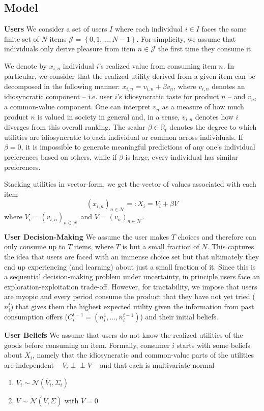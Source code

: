 \documentclass[sigconf]{acmart}
\begin{document}
\subsection{Model}
\par
\noindent \textbf{Users} We consider a set of users $I$ where each individual $i \in I$ faces the same finite set of $N$ items $\mathcal J = \left\{0,1,...,N-1\right\}$. For simplicity, we assume that individuals only derive pleasure from item $n \in \mathcal{J}$ the first time they consume it.
\par

We denote by $x_{i,n}$ individual $i$'s realized value from consuming item $n$. In particular, we consider that the realized utility derived from a given item can be decomposed in the following manner: $x_{i,n}= v_{i,n} + \beta v_n$, where $v_{i,n}$ denotes an idiosyncratic component -- i.e. user $i$'s idiosyncratic taste for product $n$ --  and $v_{n}$, a common-value component. One can interpret $v_n$ as a measure of how much product $n$ is valued in society in general and, in a sense, $v_{i,n}$ denotes how $i$ diverges from this overall ranking. The scalar $\beta \in \mathbb{R}_{t}$ denotes the degree to which utilities are idiosyncratic to each individual or common across individuals. If $\beta=0$, it is impossible to generate meaningful predictions of any one's individual preferences based on others, while if $\beta$ is large, every individual has similar preferences.
\par
Stacking utilities in vector-form, we get the vector of values associated with each item $${\left(x_{i,n}\right)}_{n \in \mathcal{N}}=:X_i =V_i+ \beta V $$ where $V_i ={\left(v_{i,n}\right)}_{n \in \mathcal{N}}$ and $V={\left(v_{n}\right)}_{n \in \mathcal{N}}$.
\par
\noindent\textbf{User Decision-Making}
We assume the user makes $T$ choices and therefore can only consume up to $T$ items, where $T$ is but a small fraction of $N$. This captures the idea that users are faced with an immense choice set but that ultimately they end up experiencing (and learning) about just a small fraction of it. Since this is a sequential decision-making problem under uncertainty, in principle users face an exploration-exploitation trade-off. However, for tractability, we impose that users are myopic and every period consume the product that they have not yet tried ($n_i^t$) that gives them the highest expected utility given the information from past consumption offers ($C_i^{t-1}=(n_i^1,...,n_i^{t-1})$) and their initial beliefs.
\par
\noindent \textbf{User Beliefs} We assume that users do not know the realized utilities of the goods before consuming an item.
Formally, consumer $i$ starts with some beliefs about $X_i$, namely that the idiosyncratic and common-value parts of the utilities are independent -- $V_i \perp \!\!\! \perp V$ -- and that each is multivariate normal
\begin{enumerate}
\item $V_i \sim \mathcal N (\overline V_i, \Sigma_i)$ 
\item $V \sim \mathcal N(\overline V, \Sigma)$ with $\overline V =0$
\end{enumerate}
\end{document}
